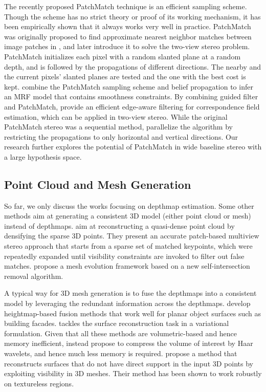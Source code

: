 The recently proposed PatchMatch technique is an efficient sampling scheme. Though the scheme has no strict theory or proof of its working mechanism, it has been empirically shown that it always works very well in practice. PatchMatch was originally proposed to find approximate nearest neighbor matches between image patches in \citet{Barnes:2009:PAR}, and later \citet{patchMatchStereo1} introduce it to solve the two-view stereo problem. PatchMatch initializes each pixel with a random slanted plane at a random depth, and is followed by the propagations of different directions. The nearby and the current pixels' slanted planes are tested and the one with the best cost is kept. \citet{patchMatchStereo2} combine the PatchMatch sampling scheme and belief propagation to infer an MRF model that contains smoothness constraints.
By combining guided filter and PatchMatch, \citet{PMF_Hongsheng} provide an efficient edge-aware filtering for correspondence field estimation, which can be applied in two-view stereo.
While the original PatchMatch stereo was a sequential method, \citet{patchMatchParallel} parallelize the algorithm by restricting the propagations to only horizontal and vertical directions. Our research further explores the potential of PatchMatch in wide baseline stereo with a large hypothesis space.

\subsection{Point Cloud and Mesh Generation}
So far, we only discuss the works focusing on depthmap estimation. Some other methods aim at generating a consistent 3D model (either point cloud or mesh) instead of depthmaps. 
\citet{FURUKAWA_PAMI2010} aim at reconstructing a quasi-dense point cloud by densifying the sparse 3D points. They present an accurate patch-based multiview stereo approach that starts from a sparse set of matched keypoints, which were repeatedly expanded until visibility constraints are invoked to filter out false matches. \citet{Zaharescu_PAMI2011} propose a mesh evolution framework based on a new self-intersection removal algorithm. 

A typical way for 3D mesh generation is to fuse the depthmaps into a consistent model by leveraging the redundant information across the depthmaps. \citet{gallup20103d,gallup2010heightmap} develop heightmap-based fusion methods that work well for planar object surfaces such as building facades. \citet{zach2008fast} tackles the surface reconstruction task in a variational formulation.
Given that all these methods are volumetric-based and hence memory inefficient, \citet{zheng2012efficient} instead propose to compress the volume of interest by Haar wavelets, and hence much less memory is required. \citet{JAN} propose a method that reconstructs surfaces that do not have direct support in the input 3D points by exploiting visibility in 3D meshes. Their method has been shown to work robustly on  textureless regions.

